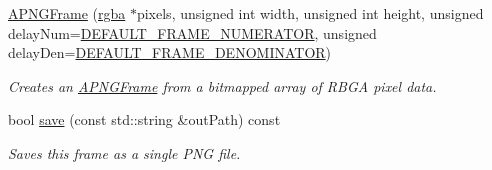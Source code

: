 \begin{DoxyCompactItemize}
\hyperlink{classapngasm_1_1APNGFrame_a5c198819ee96017ca012e5e89dbe635c}{A\-P\-N\-G\-Frame} (\hyperlink{structapngasm_1_1rgba}{rgba} $\ast$pixels, unsigned int width, unsigned int height, unsigned delay\-Num=\hyperlink{namespaceapngasm_a5b334b6957e14291ff8f76cab562f60f}{D\-E\-F\-A\-U\-L\-T\-\_\-\-F\-R\-A\-M\-E\-\_\-\-N\-U\-M\-E\-R\-A\-T\-O\-R}, unsigned delay\-Den=\hyperlink{namespaceapngasm_a867b3acbcc2624faf6b3e82732110594}{D\-E\-F\-A\-U\-L\-T\-\_\-\-F\-R\-A\-M\-E\-\_\-\-D\-E\-N\-O\-M\-I\-N\-A\-T\-O\-R})
\begin{DoxyCompactList}\small\item\em Creates an \hyperlink{classapngasm_1_1APNGFrame}{A\-P\-N\-G\-Frame} from a bitmapped array of R\-B\-G\-A pixel data. \end{DoxyCompactList}\item 
bool \hyperlink{classapngasm_1_1APNGFrame_aa24ea3ac279325e3a97dc0fac6337d20}{save} (const std\-::string \&out\-Path) const 
\begin{DoxyCompactList}\small\item\em Saves this frame as a single P\-N\-G file. \end{DoxyCompactList}\end{DoxyCompactItemize}
